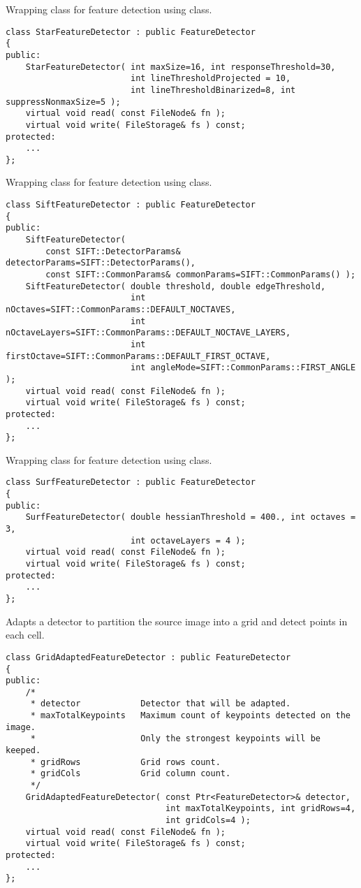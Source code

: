 Wrapping class for feature detection using  class.

\begin{lstlisting}
class StarFeatureDetector : public FeatureDetector
{
public:
    StarFeatureDetector( int maxSize=16, int responseThreshold=30, 
                         int lineThresholdProjected = 10,
                         int lineThresholdBinarized=8, int suppressNonmaxSize=5 );
    virtual void read( const FileNode& fn );
    virtual void write( FileStorage& fs ) const;
protected:
    ...
};
\end{lstlisting}

Wrapping class for feature detection using  class.

\begin{lstlisting}
class SiftFeatureDetector : public FeatureDetector
{
public:
    SiftFeatureDetector( 
        const SIFT::DetectorParams& detectorParams=SIFT::DetectorParams(),
        const SIFT::CommonParams& commonParams=SIFT::CommonParams() );
    SiftFeatureDetector( double threshold, double edgeThreshold,
                         int nOctaves=SIFT::CommonParams::DEFAULT_NOCTAVES,
                         int nOctaveLayers=SIFT::CommonParams::DEFAULT_NOCTAVE_LAYERS,
                         int firstOctave=SIFT::CommonParams::DEFAULT_FIRST_OCTAVE,
                         int angleMode=SIFT::CommonParams::FIRST_ANGLE );
    virtual void read( const FileNode& fn );
    virtual void write( FileStorage& fs ) const;
protected:
    ...
};
\end{lstlisting}

Wrapping class for feature detection using  class.

\begin{lstlisting}
class SurfFeatureDetector : public FeatureDetector
{
public:
    SurfFeatureDetector( double hessianThreshold = 400., int octaves = 3,
                         int octaveLayers = 4 );
    virtual void read( const FileNode& fn );
    virtual void write( FileStorage& fs ) const;
protected:
    ...
};
\end{lstlisting}

Adapts a detector to partition the source image into a grid and detect 
points in each cell.

\begin{lstlisting}
class GridAdaptedFeatureDetector : public FeatureDetector
{
public:
    /*
     * detector            Detector that will be adapted.
     * maxTotalKeypoints   Maximum count of keypoints detected on the image. 
     *                     Only the strongest keypoints will be keeped.
     * gridRows            Grid rows count.
     * gridCols            Grid column count.
     */
    GridAdaptedFeatureDetector( const Ptr<FeatureDetector>& detector, 
                                int maxTotalKeypoints, int gridRows=4, 
                                int gridCols=4 );
    virtual void read( const FileNode& fn );
    virtual void write( FileStorage& fs ) const;
protected:
    ...
};
\end{lstlisting}


